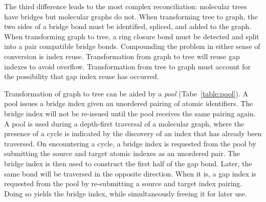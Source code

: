 \documentclass{article}
\begin{document}
The third difference leads to the most complex reconciliation: molecular trees have bridges but molecular graphs do not. When transforming tree to graph, the two sides of a bridge bond must be identified, spliced, and added to the graph. When transforming graph to tree, a ring closure bond must be detected and split into a pair compatible bridge bonds. Compounding the problem in either sense of conversion is index reuse. Transformation from graph to tree will reuse gap indexes to avoid overflow. Transformation from tree to graph must account for the possibility that gap index reuse has occurred.

Transformation of graph to tree can be aided by a \textit{pool} (Tabe~\ref{table:pool}). A pool issues a bridge index given an unordered pairing of atomic identifiers. The bridge index will not be re-issued until the pool receives the same pairing again. A pool is used during a depth-first traversal of a molecular graph, where the presence of a cycle is indicated by the discovery of an index that has already been traversed. On encountering a cycle, a bridge index is requested from the pool by submitting the source and target atomic indexes as an unordered pair. The bridge index is then used to construct the first half of the gap bond. Later, the same bond will be traversed in the opposite direction. When it is, a gap index is requested from the pool by re-submitting a source and target index pairing. Doing so yields the bridge index, while simultaneously freeing it for later use.
\end{document}
